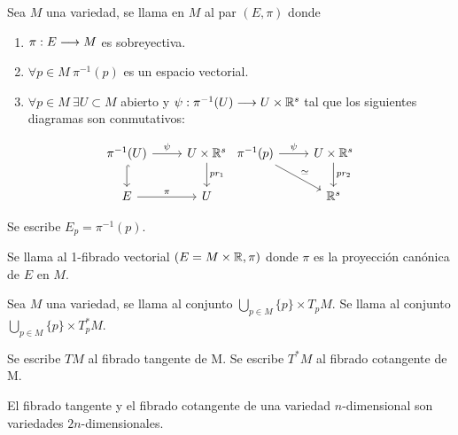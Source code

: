 \begin{definition}
  Sea $M$ una variedad, se llama  en $M$ al par $(E, \pi)$ donde
  \begin{enumerate}
    \item $\pi:E\longrightarrow M$ es sobreyectiva.
    \item $\forall p\in M\ \pi^{-1}(p)$ es un espacio vectorial.
    \item $\forall p\in M\ \exists U\subset M$ abierto y $\psi:\pi^{-1}(U)\longrightarrow U\times\mathbb{R}^s$ tal que los siguientes diagramas son conmutativos:
  \end{enumerate}
  \[
    \begin{tikzcd}
      \pi^{-1}(U)\arrow{r}{\psi}\arrow[hook]{d} & U\times\R^s\arrow{d}{pr_1}\\
      E\arrow{r}{\pi} & U
    \end{tikzcd}
    \begin{tikzcd}
      \pi^{-1}(p)\arrow{r}{\psi}\arrow{dr}{\simeq} & U\times\R^s\arrow{d}{pr_2}\\
       & \R^s
    \end{tikzcd}
  \]
\end{definition}
\begin{notation}
  Se escribe $E_p=\pi^{-1}(p)$.
\end{notation}

\begin{definition}
Se llama  al 1-fibrado vectorial $(E=M\times\mathbb{R},\pi)$ donde
$\pi$
es la proyección canónica de $E$ en $M$.
\end{definition}

\begin{definition}
  Sea $M$ una variedad, se llama  al conjunto $\bigcup_{p\in M}\{p\}\times T_pM$.
  Se llama  al conjunto $\bigcup_{p\in M}\{p\}\times T^*_pM$.
\end{definition}
\begin{notation}
  Se escribe $TM$ al fibrado tangente de M. Se escribe $T^* M$ al fibrado cotangente de M\@.
\end{notation}

\begin{exercise}
  El fibrado tangente y el fibrado cotangente de una variedad $n$-dimensional son variedades $2n$-dimensionales.
\end{exercise}

